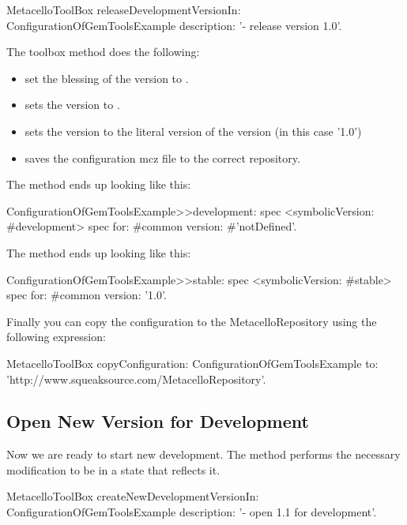 \documentclass[a4paper,10pt,twoside]{book}
\begin{document}
\begin{code}{}
  MetacelloToolBox
     releaseDevelopmentVersionIn: ConfigurationOfGemToolsExample
     description: '- release version 1.0'.
\end{code}     

The toolbox method  does the following:
\begin{itemize}
\item set the blessing of the  version to .
\item sets the  version to .
\item sets the  version to the literal version of the  version (in this case '1.0')
\item saves the configuration mcz file to the correct repository.
\end{itemize}


The  method ends up looking like this:

\begin{code}{}
ConfigurationOfGemToolsExample>>development: spec
  <symbolicVersion: #development>
  spec for: #common version: #'notDefined'.
\end{code}  
  
The  method ends up looking like this:

\begin{code}{}
ConfigurationOfGemToolsExample>>stable: spec
  <symbolicVersion: #stable>
  spec for: #common version: '1.0'.
\end{code}  
  
Finally you can copy the configuration to the MetacelloRepository using the following expression:

\begin{code}{}
  MetacelloToolBox
     copyConfiguration: ConfigurationOfGemToolsExample
     to: 'http://www.squeaksource.com/MetacelloRepository'.
\end{code}


\subsection{Open New Version for Development}

Now we are ready to start new development. The method 
performs the necessary modification to be in a state that reflects it. 


\begin{code}{}
MetacelloToolBox
  createNewDevelopmentVersionIn: ConfigurationOfGemToolsExample
  description: '- open 1.1 for development'.
\end{code}
\end{document}
